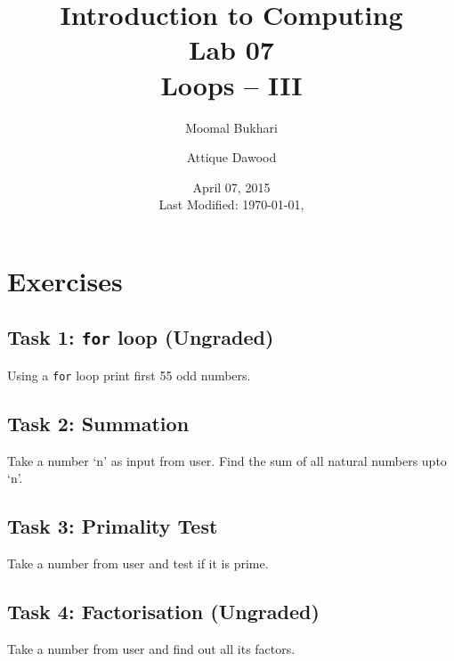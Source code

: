 \documentclass[12pt,a4paper]{article}
\title{Introduction to Computing\\Lab 07\\Loops -- III}
\author{Moomal Bukhari\and Attique Dawood}
\date{April 07, 2015\\[0.2cm] Last Modified: \today, \currenttime}
\begin{document}
\maketitle
\section{Exercises}
\subsection{Task 1: \texttt{for} loop (Ungraded)} Using a \verb|for| loop print first 55 odd numbers.
\subsection{Task 2: Summation} Take a number `n' as input from user. Find the sum of all natural numbers upto `n'.
\subsection{Task 3: Primality Test} Take a number from user and test if it is prime.
\subsection{Task 4: Factorisation (Ungraded)} Take a number from user and find out all its factors.
\end{document}
